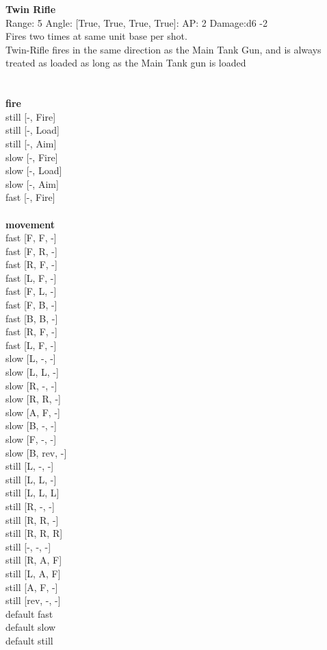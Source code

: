 {\bf Twin Rifle } \\



Range: 5  Angle: [True, True, True, True]: AP: 2 Damage:d6 -2 \\
Fires two times at same unit base per shot.\\Twin-Rifle fires in the same direction as the Main Tank Gun, and is always treated as loaded as long as the Main Tank gun is loaded\\ 




 
\ \\



\ \\ {\bf fire } \\
still [-, Fire] \\
still [-, Load] \\
still [-, Aim] \\
slow [-, Fire] \\
slow [-, Load] \\
slow [-, Aim] \\
fast [-, Fire] \\
\ \\ {\bf movement } \\
fast [F, F, -] \\
fast [F, R, -] \\
fast [R, F, -] \\
fast [L, F, -] \\
fast [F, L, -] \\
fast [F, B, -] \\
fast [B, B, -] \\
fast [R, F, -] \\
fast [L, F, -] \\
slow [L, -, -] \\
slow [L, L, -] \\
slow [R, -, -] \\
slow [R, R, -] \\
slow [A, F, -] \\
slow [B, -, -] \\
slow [F, -, -] \\
slow [B, rev, -] \\
still [L, -, -] \\
still [L, L, -] \\
still [L, L, L] \\
still [R, -, -] \\
still [R, R, -] \\
still [R, R, R] \\
still [-, -, -] \\
still [R, A, F] \\
still [L, A, F] \\
still [A, F, -] \\
still [rev, -, -] \\
default fast \\
default slow \\
default still \\


